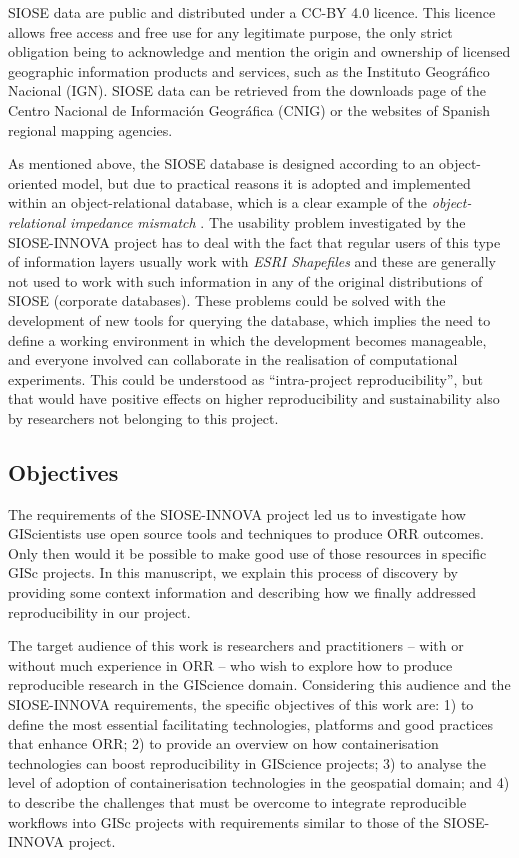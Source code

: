 \documentclass[ijgi,article,submit,moreauthors,pdftex]{Definitions/mdpi}
\begin{document}
SIOSE data are public and distributed under a CC-BY 4.0 licence. This licence allows free access and free use for any legitimate purpose, the only strict obligation being to acknowledge and mention the origin and ownership of licensed geographic information products and services, such as the Instituto Geográfico Nacional (IGN). SIOSE data can be retrieved from the downloads page of the Centro Nacional de Información Geográfica (CNIG) \cite{cnig} or the websites of Spanish regional mapping agencies.

As mentioned above, the SIOSE database is designed according to an object-oriented model, but due to practical reasons it is adopted and implemented within an object-relational database, which is a clear example of the \textit{object-relational impedance mismatch} \cite{NavarroCarrion2016}. The usability problem investigated by the SIOSE-INNOVA project has to deal with the fact that regular users of this type of information layers usually work with \textit{ESRI Shapefiles} and these are generally not used to work with such information in any of the original distributions of SIOSE (corporate databases). These problems could be solved with the development of new tools for querying the database, which implies the need to define a working environment in which the development becomes manageable, and everyone involved can collaborate in the realisation of computational experiments. This could be understood as ``intra-project reproducibility'', but that would have positive effects on higher reproducibility and sustainability also by researchers not belonging to this project.

\subsection{Objectives}
\label{subsec:objectives}

The requirements of the SIOSE-INNOVA project led us to investigate how GIScientists use open source tools and techniques to produce ORR outcomes. Only then would it be possible to make good use of those resources in specific GISc projects. In this manuscript, we explain this process of discovery by providing some context information and describing how we finally addressed reproducibility in our project.

The target audience of this work is researchers and practitioners -- with or without much experience in ORR -- who wish to explore how to produce reproducible research in the GIScience domain. Considering this audience and the SIOSE-INNOVA requirements, the specific objectives of this work are: 1) to define the most essential facilitating technologies, platforms and good practices that enhance ORR; 2) to provide an overview on how containerisation technologies can boost reproducibility in GIScience projects; 3) to analyse the level of adoption of containerisation technologies in the geospatial domain; and 4) to describe the challenges that must be overcome to integrate reproducible workflows into GISc projects with requirements similar to those of the SIOSE-INNOVA project.
\end{document}
